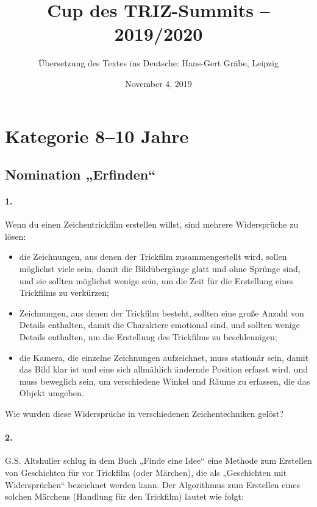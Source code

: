 \documentclass[11pt,a4paper]{article}
\title{Cup des TRIZ-Summits – 2019/2020}
\author{Übersetzung des Textes ins Deutsche: Hans-Gert Gr\"abe, Leipzig}
\date{November 4, 2019}
\begin{document}
\maketitle

\section*{Kategorie 8--10 Jahre}

\subsection*{Nomination „Erfinden“}

\paragraph {1.}
Wenn du einen Zeichentrickfilm erstellen willst, sind mehrere Widersprüche zu
lösen:
\begin {itemize}
\item die Zeichnungen, aus denen der Trickfilm zusammengestellt wird, sollen
  möglichst viele sein, damit die Bildübergänge glatt und ohne Sprünge sind,
  und sie sollten möglichst wenige sein, um die Zeit für die Erstellung eines
  Trickfilms zu verkürzen;
\item Zeichnungen, aus denen der Trickfilm besteht, sollten eine große Anzahl
  von Details enthalten, damit die Charaktere emotional sind, und sollten
  wenige Details enthalten, um die Erstellung des Trickfilms zu beschleunigen;
\item die Kamera, die einzelne Zeichnungen aufzeichnet, muss stationär sein,
  damit das Bild klar ist und eine sich allmählich ändernde Position erfasst
  wird, und muss beweglich sein, um verschiedene Winkel und Räume zu erfassen,
  die das Objekt umgeben.
\end{itemize}
Wie wurden diese Widersprüche in verschiedenen Zeichentechniken gelöst?

\paragraph{2.}
G.S. Altshuller schlug in dem Buch „Finde eine Idee“ eine Methode zum
Erstellen von Geschichten für vor Trickfilm (oder Märchen), die als
„Geschichten mit Widersprüchen“ bezeichnet werden kann.  Der Algorithmus zum
Erstellen eines solchen Märchens (Handlung für den Trickfilm) lautet wie
folgt:
\end{document}
